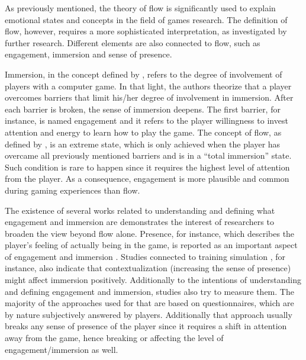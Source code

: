 As previously mentioned, the theory of flow is significantly used to explain emotional states and concepts in the field of games research. The definition of flow, however, requires a more sophisticated interpretation, as investigated by further research. %
Different elements are also connected to flow, such as engagement, immersion and sense of presence.

Immersion, in the concept defined by \textcite{brown2004grounded}, refers to the degree of involvement of players with a computer game. In that light, the authors theorize that a player overcomes barriers that limit his/her degree of involvement in immersion. After each barrier is broken, the sense of immersion deepens. The first barrier, for instance, is named engagement and it refers to the player willingness to invest attention and energy to learn how to play the game. The concept of flow, as defined by \textcite{nakamura2014concept}, is an extreme state, which is only achieved when the player has overcame all previously mentioned barriers and is in a ``total immersion'' state. Such condition is rare to happen since it requires the highest level of attention from the player. As a consequence, engagement is more plausible and common during gaming experiences than flow.

The existence of several works \parencite{boyle2012engagement} related to understanding and defining what engagement and immersion are demonstrates the interest of researchers to broaden the view beyond flow alone. Presence, for instance, which describes the player's feeling of actually being in the game, is reported as an important aspect of engagement and immersion \parencite{weibel2011immersion}. Studies connected to training simulation \parencite{engstrom2016impact}, for instance, also indicate that contextualization (increasing the sense of presence) might affect immersion positively. Additionally to the intentions of understanding and defining engagement and immersion, studies also try to measure them. The majority of the approaches used for that are based on questionnaires, which are by nature subjectively answered by players. Additionally that approach usually breaks any sense of presence of the player since it requires a shift in attention away from the game, hence breaking or affecting the level of engagement/immersion as well.

